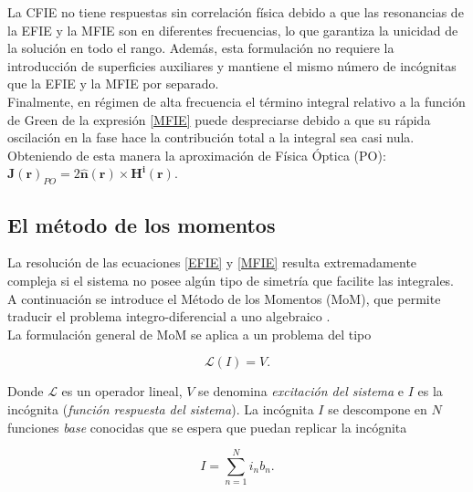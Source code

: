 \documentclass[11pt,a4paper,twoside,pdf]{article}
\numberwithin{equation}{section}
\begin{document}
La CFIE no tiene respuestas sin correlación física debido a que las resonancias de la EFIE y
la MFIE son en diferentes frecuencias, lo que garantiza la unicidad de la solución en todo el rango. Además, esta formulación no requiere la introducción de superficies
auxiliares y mantiene el mismo número de incógnitas que la EFIE y la MFIE por separado.\\


Finalmente, en régimen de alta frecuencia el término integral relativo a la función de Green de la expresión \ref{MFIE} puede despreciarse debido a que su rápida oscilación en la fase hace la contribución total a la integral sea casi nula. Obteniendo de esta manera la aproximación de Física Óptica (PO): $\boldsymbol{J}(\boldsymbol{r})_{PO} = 2 \boldsymbol{\hat{n}}(\boldsymbol{r}) \times \boldsymbol{H^i} (\boldsymbol{r})
$.













\subsection{El método de los momentos}



La resolución de las ecuaciones \ref{EFIE} y \ref{MFIE} resulta extremadamente compleja si el sistema no posee algún tipo de simetría que facilite las integrales. A continuación se introduce el Método de los Momentos (MoM), que permite traducir el problema integro-diferencial a uno algebraico \cite{harrington1993field}.\\

La formulación general de MoM se aplica a un problema del tipo

\begin{equation}
    \mathscr{L} (I) = V.
\label{MoM}
\end{equation}
    


Donde $\mathscr{L}$ es un operador lineal, $V$ se denomina \textit{excitación del sistema} e $I$ es la incógnita (\textit{función respuesta del sistema}). La incógnita $I$ se descompone en $N$ funciones \textit{base} conocidas que se espera que puedan replicar la incógnita

$$
    I = \sum_{n=1}^N i_n b_n.
$$
\end{document}
